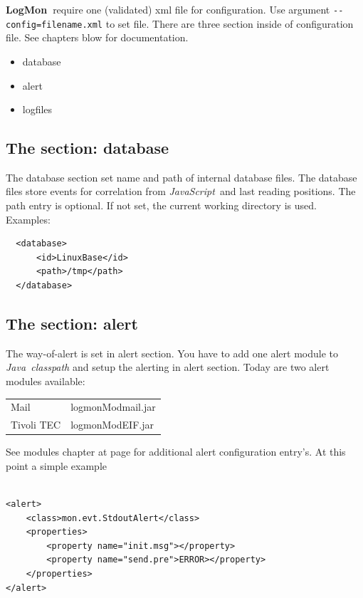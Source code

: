 \documentclass[11pt,a4paper]{article}
\newcommand{\logmon}{\textbf{LogMon\ }}
\newcommand{\js}{\textit{JavaScript\ }}
\newcommand{\java}{\textit{Java\ }}
\begin{document}
\logmon require one (validated) xml file for configuration. Use argument
 \verb#--config=filename.xml# to set file.
There are three section inside of configuration file. See chapters blow for documentation.

\begin{itemize}
  \item database
  \item alert
  \item logfiles
\end{itemize}

\subsection{The section: database}
\label{sec:cfgdb}

The database section set name and path of internal database files. The database files store events for
correlation from \js and last reading positions. The path entry is optional. If not set, the current working
directory is used. Examples:

\begin{verbatim}
  <database>
      <id>LinuxBase</id>
      <path>/tmp</path>
  </database>
\end{verbatim}

\subsection{The section: alert}

The way-of-alert is set in alert section. You have to add one alert module to \java \textit{classpath}
and setup the alerting in alert section. Today are two alert modules available:

\bigskip
\begin{tabular}{ll}
  Mail 	     & logmonModmail.jar\\[1ex]
  Tivoli TEC & logmonModEIF.jar\\
\end{tabular}
\bigskip

See modules chapter at page \pageref{sec:modules} for additional alert
configuration entry's. At this point a simple example

\begin{samepage}
\begin{verbatim}

<alert>
    <class>mon.evt.StdoutAlert</class>
    <properties>
        <property name="init.msg"></property>
        <property name="send.pre">ERROR></property>
    </properties>
</alert>

\end{verbatim}
\end{samepage}
\end{document}
